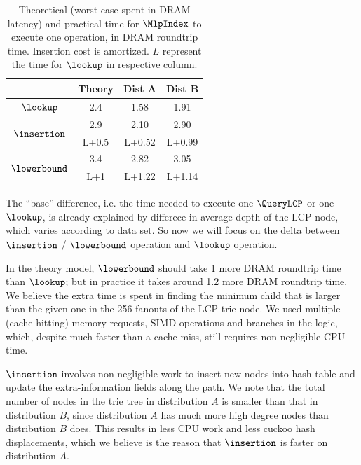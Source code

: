 \documentclass[11pt, usletter]{article}
\begin{document}
\begin{table}[]
\centering
\begin{tabular}{|c|c|c|c|}
\hline
                             & Theory                      & Dist A                      & Dist B                      \\ \hline
$\lookup$                      & 2.4                         & 1.58                        & 1.91                        \\ \hline
\multirow{2}{*}{$\insertion$}  & 2.9                         & 2.10                        & 2.90                        \\ \cline{2-4} 
                             & L+0.5                      & L+0.52                      & L+0.99                      \\ \hline
\multirow{2}{*}{$\lowerbound$} & 3.4                         & 2.82                        & 3.05                        \\ \cline{2-4} 
                             & \multicolumn{1}{c|}{L+1} & \multicolumn{1}{c|}{L+1.22} & \multicolumn{1}{c|}{L+1.14} \\ \hline
\end{tabular}
\caption{Theoretical (worst case spent in DRAM latency) and practical time for $\MlpIndex$ to execute one operation, in DRAM roundtrip time.
Insertion cost is amortized. $L$ represent the time for $\lookup$ in respective column.}
\label{mlpindex_theory_practice}
\end{table}

The ``base'' difference, i.e. the time needed to execute one $\QueryLCP$ or one $\lookup$, 
is already explained by differece in average depth of the LCP node, which varies according to data set. 
So now we will focus on the delta between $\insertion$ / $\lowerbound$ operation and $\lookup$ operation.

In the theory model, $\lowerbound$ should take 1 more DRAM roundtrip time than $\lookup$; 
but in practice it takes around 1.2 more DRAM roundtrip time. 
We believe the extra time is spent in finding the minimum child that is larger than the given one in the 256 fanouts of the LCP trie node. 
We used multiple (cache-hitting) memory requests, SIMD operations and branches in the logic, 
which, despite much faster than a cache miss, still requires non-negligible CPU time.

$\insertion$ involves non-negligible work to insert new nodes into hash table and update the extra-information fields along the path. 
We note that the total number of nodes in the trie tree in distribution $A$ is smaller than that in distribution $B$, 
since distribution $A$ has much more high degree nodes than distribution $B$ does.
This results in less CPU work and less cuckoo hash displacements, which we believe is the reason that $\insertion$ is faster on distribution $A$.
\end{document}
